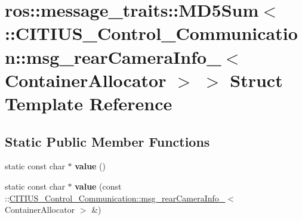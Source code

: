 \hypertarget{structros_1_1message__traits_1_1_m_d5_sum_3_01_1_1_c_i_t_i_u_s___control___communication_1_1msg_6de824479c4227bab6cb3eb7f53bd65a}{\section{ros\-:\-:message\-\_\-traits\-:\-:\-M\-D5\-Sum$<$ \-:\-:\-C\-I\-T\-I\-U\-S\-\_\-\-Control\-\_\-\-Communication\-:\-:msg\-\_\-rear\-Camera\-Info\-\_\-$<$ \-Container\-Allocator $>$ $>$ \-Struct \-Template \-Reference}
\label{structros_1_1message__traits_1_1_m_d5_sum_3_01_1_1_c_i_t_i_u_s___control___communication_1_1msg_6de824479c4227bab6cb3eb7f53bd65a}
}
\subsection*{\-Static \-Public \-Member \-Functions}
\begin{DoxyCompactItemize}
\item 
\hypertarget{structros_1_1message__traits_1_1_m_d5_sum_3_01_1_1_c_i_t_i_u_s___control___communication_1_1msg_6de824479c4227bab6cb3eb7f53bd65a_a6e5f016fb7388513dd831e57ee75eca9}{static const char $\ast$ {\bfseries value} ()}\label{structros_1_1message__traits_1_1_m_d5_sum_3_01_1_1_c_i_t_i_u_s___control___communication_1_1msg_6de824479c4227bab6cb3eb7f53bd65a_a6e5f016fb7388513dd831e57ee75eca9}

\item 
\hypertarget{structros_1_1message__traits_1_1_m_d5_sum_3_01_1_1_c_i_t_i_u_s___control___communication_1_1msg_6de824479c4227bab6cb3eb7f53bd65a_a80e0c8641d62905ce08a158bc460c3f6}{static const char $\ast$ {\bfseries value} (const \-::\hyperlink{struct_c_i_t_i_u_s___control___communication_1_1msg__rear_camera_info__}{\-C\-I\-T\-I\-U\-S\-\_\-\-Control\-\_\-\-Communication\-::msg\-\_\-rear\-Camera\-Info\-\_\-}$<$ \-Container\-Allocator $>$ \&)}\label{structros_1_1message__traits_1_1_m_d5_sum_3_01_1_1_c_i_t_i_u_s___control___communication_1_1msg_6de824479c4227bab6cb3eb7f53bd65a_a80e0c8641d62905ce08a158bc460c3f6}

\end{DoxyCompactItemize}
